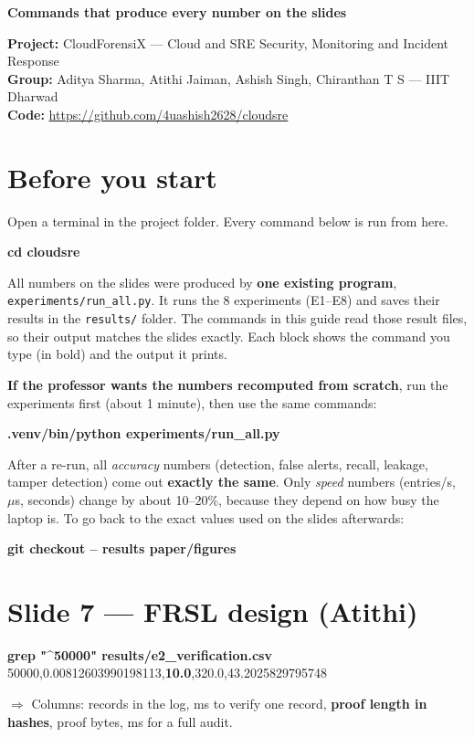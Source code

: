 \documentclass[10pt,a4paper]{article}
\newcommand{\num}[1]{\needspace{8\baselineskip}\par\medskip{\large\bfseries\color{rust}#1}\par}
\newcommand{\means}[1]{\par{\color{ink}$\Rightarrow$ #1}\par}
\newcommand{\cmd}[1]{\textcolor{ink}{\textbf{#1}}}
\begin{document}
{\LARGE\bfseries\color{ink} Commands that produce every number on the slides}\par
\smallskip
\textbf{Project:} CloudForensiX --- Cloud and SRE Security, Monitoring and Incident Response\\
\textbf{Group:} Aditya Sharma, Atithi Jaiman, Ashish Singh, Chiranthan T S --- IIIT Dharwad\\
\textbf{Code:} \url{https://github.com/4uashish2628/cloudsre}

\section{Before you start}

Open a terminal in the project folder. Every command below is run from here.
\begin{run}
\cmd{cd cloudsre}
\end{run}

All numbers on the slides were produced by \textbf{one existing program}, \texttt{experiments/run\_all.py}. It runs the 8 experiments (E1--E8) and saves their results in the \texttt{results/} folder. The commands in this guide read those result files, so their output matches the slides exactly. Each block shows the command you type (in bold) and the output it prints.

\textbf{If the professor wants the numbers recomputed from scratch}, run the experiments first (about 1 minute), then use the same commands:
\begin{run}
\cmd{.venv/bin/python experiments/run_all.py}
\end{run}
After a re-run, all \emph{accuracy} numbers (detection, false alerts, recall, leakage, tamper detection) come out \textbf{exactly the same}. Only \emph{speed} numbers (entries/s, $\mu$s, seconds) change by about 10--20\%, because they depend on how busy the laptop is. To go back to the exact values used on the slides afterwards:
\begin{run}
\cmd{git checkout -- results paper/figures}
\end{run}

\section{Slide 7 --- FRSL design (Atithi)}

\num{``10 hashes'' to prove one record}
\begin{run}
\cmd{grep "^50000" results/e2_verification.csv}
50000,0.00812603990198113,\textbf{10.0},320.0,43.2025829795748
\end{run}
\means{Columns: records in the log, ms to verify one record, \textbf{proof length in hashes}, proof bytes, ms for a full audit.}
\end{document}
